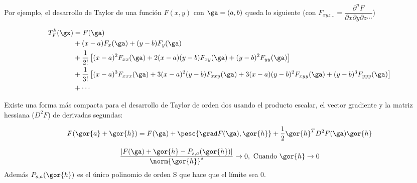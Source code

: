 Por ejemplo, el desarrollo de Taylor de una función $F(x,y)$ con $\ga = (a,b)$ queda lo siguiente (con $F_{xyz\dotsc} = \dfrac{\partial^nF}{\partial x \partial y \partial z \dotsb}$)

\begin{align*}
T^k_{F}(\gx) &= F(\ga) \\
& +  (x - a) F_x(\ga) + (y - b) F_y(\ga)  \\
& +\frac{1}{2!}\left[(x-a)^2F_{xx}(\ga) + 2(x-a)(y-b)F_{xy}(\ga) + (y-b)^2F_{yy}(\ga)\right] \\
& +\frac{1}{3!}\left[(x-a)^3F_{xxx}(\ga) + 3(x-a)^2(y-b)F_{xxy}(\ga) + 3(x-a)(y-b)^2 F_{xyy} (\ga) + (y-b)^3F_{yyy} (\ga)\right] \\
& +\dotsb
\end{align*}

Existe una forma más compacta para el desarrollo de Taylor de orden dos usando el producto escalar, el vector gradiente y la matriz hessiana ($D^2F$) de derivadas segundas:

\[ F(\gor{a}+\gor{h}) = F(\ga) + \pesc{\grad F(\ga),\gor{h}} + \frac{1}{2} \gor{h}^T D^2F(\ga)\gor{h} \]

\begin{theorem}
 $$\frac{|F(\ga)+\gor{h} - P_{s,a}(\gor{h})|}{\norm{\gor{h}}^s} \rightarrow 0, \text{ Cuando } \gor{h} \rightarrow 0$$
 Además $P_{s,a}(\gor{h})$ es el único polinomio de orden S que hace que el límite sea 0.
\end{theorem}